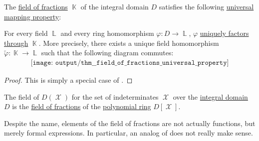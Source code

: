 \begin{theorem}\label{thm:field_of_fractions_universal_property}
  The \hyperref[thm:field_of_fractions]{field of fractions} \( \BbbK \) of the integral domain \( D \) satisfies the following \hyperref[rem:universal_mapping_property]{universal mapping property}:
  \begin{displayquote}
    For every field \( \BbbL \) and every ring homomorphism \( \varphi: D \to \BbbL \), \( \varphi \) \hyperref[def:factors_through]{uniquely factors through} \( \BbbK \). More precisely, there exists a unique field homomorphism \( \widetilde{\varphi}: \BbbK \to \BbbL \) such that the following diagram commutes:
    \begin{equation}\label{eq:thm:field_of_fractions_universal_property/diagram}
      \begin{aligned}
        \texttt{[image: output/thm\_\_field\_of\_fractions\_universal\_property]}
      \end{aligned}
    \end{equation}
  \end{displayquote}
\end{theorem}
\begin{proof}
  This is simply a special case of .
\end{proof}

\begin{definition}\label{def:rational_function_field}
  The field of  \( D(\mscrX) \) for the set of indeterminates \( \mscrX \) over the \hyperref[def:integral_domain]{integral domain} \( D \) is the \hyperref[thm:field_of_fractions]{field of fractions} of the \hyperref[def:polynomial_algebra]{polynomial ring} \( D[\mscrX] \).

  Despite the name, elements of the field of fractions are not actually functions, but merely formal expressions. In particular, an analog of  does not really make sense.
\end{definition}

